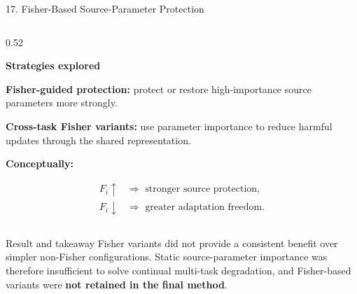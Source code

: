 \documentclass[aspectratio=169,11pt]{beamer}
\begin{document}
\begin{frame}{17. Fisher-Based Source-Parameter Protection}
\begin{columns}[T,onlytextwidth]
\begin{column}{0.52\textwidth}

\textbf{Strategies explored}

\vspace{0.15em}

\textbf{\color{blue!70!black}Fisher-guided protection:}
protect or restore high-importance source parameters more strongly.

\vspace{0.3em}

\textbf{\color{blue!70!black}Cross-task Fisher variants:}
use parameter importance to reduce harmful updates through the shared
representation.

\vspace{0.3em}

\textbf{Conceptually:}

\vspace{-0.35em}

\[
\begin{aligned}
F_i \uparrow
&\Rightarrow \text{ stronger source protection},\\
F_i \downarrow
&\Rightarrow \text{ greater adaptation freedom}.
\end{aligned}
\]

\end{column}

\end{columns}

\vspace{-0.25em}

\begin{alertblock}{Result and takeaway}
\scriptsize
Fisher variants did not provide a consistent benefit over simpler
non-Fisher configurations.
Static source-parameter importance was therefore insufficient to solve
continual multi-task degradation, and Fisher-based variants were
\textbf{not retained in the final method}.
\end{alertblock}

\end{frame}
\end{document}
